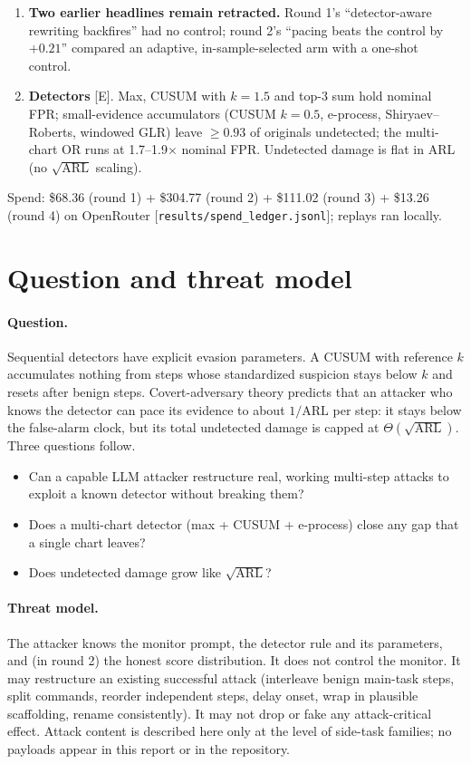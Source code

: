 \documentclass[11pt]{article}
\newcommand{\tE}{\textsf{\scriptsize\textcolor{ink2}{[E]}}\xspace}
\newcommand{\src}[1]{{\footnotesize\textcolor{ink2}{[\nolinkurl{#1}]}}}
\begin{document}
{\begin{enumerate}[leftmargin=1.2em]
\item \textbf{Two earlier headlines remain retracted.} Round 1's ``detector-aware rewriting backfires'' had no control; round 2's ``pacing beats the control by $+0.21$'' compared an adaptive, in-sample-selected arm with a one-shot control.
\item \textbf{Detectors} \tE. Max, CUSUM with $k=1.5$ and top-3 sum hold nominal FPR; small-evidence accumulators (CUSUM $k=0.5$, e-process, Shiryaev--Roberts, windowed GLR) leave $\ge0.93$ of originals undetected; the multi-chart OR runs at 1.7--1.9$\times$ nominal FPR. Undetected damage is flat in ARL (no $\sqrt{\mathrm{ARL}}$ scaling).
\end{enumerate}
Spend: \$68.36 (round 1) + \$304.77 (round 2) + \$111.02 (round 3) + \$13.26 (round 4) on OpenRouter \src{results/spend_ledger.jsonl}; replays ran locally.}


\section{Question and threat model}

\paragraph{Question.} Sequential detectors have explicit evasion parameters. A CUSUM with reference $k$ accumulates nothing from steps whose standardized suspicion stays below $k$ and resets after benign steps. Covert-adversary theory predicts that an attacker who knows the detector can pace its evidence to about $1/\mathrm{ARL}$ per step: it stays below the false-alarm clock, but its total undetected damage is capped at $\Theta(\sqrt{\mathrm{ARL}})$. Three questions follow.
\begin{itemize}
\item Can a capable LLM attacker restructure real, working multi-step attacks to exploit a known detector without breaking them?
\item Does a multi-chart detector (max + CUSUM + e-process) close any gap that a single chart leaves?
\item Does undetected damage grow like $\sqrt{\mathrm{ARL}}$?
\end{itemize}

\paragraph{Threat model.} The attacker knows the monitor prompt, the detector rule and its parameters, and (in round 2) the honest score distribution. It does not control the monitor. It may restructure an existing successful attack (interleave benign main-task steps, split commands, reorder independent steps, delay onset, wrap in plausible scaffolding, rename consistently). It may not drop or fake any attack-critical effect. Attack content is described here only at the level of side-task families; no payloads appear in this report or in the repository.
\end{document}
